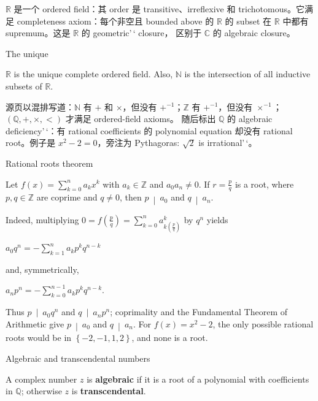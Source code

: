 \(\mathbb{R}\) 是一个 ordered field：其 order 是 transitive、irreflexive 和 trichotomous。它满足 completeness axiom：每个非空且 bounded above 的 \(\mathbb{R}\) 的 subset 在 \(\mathbb{R}\) 中都有 supremum。这是 \(\mathbb{R}\) 的 geometric'\,` closure， 区别于 \(\mathbb{C}\) 的 algebraic closure。

\begin{theorem}{The unique }

\(\mathbb{R}\) is the unique complete ordered field. Also, \(\mathbb{N}\) is the intersection of all inductive subsets of \(\mathbb{R}\).

\end{theorem}

源页以混排写道：\(\mathbb{N}\) 有 \(+\) 和 \(\times\)，但没有 \(+^{- 1}\)；\(\mathbb{Z}\) 有 \(+^{- 1}\)，但没有 \(\times^{- 1}\)；\(\left( {\mathbb{Q}, + , \times , <} \right)\) 才满足 ordered-field axioms。 随后标出 \(\mathbb{Q}\) 的 algebraic deficiency'\,`：有 rational coefficients 的 polynomial equation 却没有 rational root。例子是 \(x^{2} - 2 = 0\)，旁注为 Pythagoras: \(\sqrt{2}\) is irrational'\,`。

\begin{theorem}{Rational roots theorem}

Let \(f(x) = \sum_{k = 0}^{n}a_{k}x^{k}\) with \(a_{k} \in \mathbb{Z}\) and \(a_{0}a_{n} \neq 0\). If \(r = \frac{p}{q}\) is a root, where \(p,q \in \mathbb{Z}\) are coprime and \(q \neq 0\), then \(\left. p\  \middle| \ a_{0} \right.\) and \(\left. q\  \middle| \ a_{n} \right.\).

\end{theorem}

Indeed, multiplying \(0 = f\left( \frac{p}{q} \right) = \sum_{k = 0}^{n}a_{k{(\frac{p}{q})}}^{k}\) by \(q^{n}\) yields

\(a_{0}q^{n} = - \sum_{k = 1}^{n}a_{k}p^{k}q^{n - k}\)

and, symmetrically,

\(a_{n}p^{n} = - \sum_{k = 0}^{n - 1}a_{k}p^{k}q^{n - k}\).

Thus \(\left. p\  \middle| \ a_{0}q^{n} \right.\) and \(\left. q\  \middle| \ a_{n}p^{n} \right.\); coprimality and the Fundamental Theorem of Arithmetic give \(\left. p\  \middle| \ a_{0} \right.\) and \(\left. q\  \middle| \ a_{n} \right.\). For \(f(x) = x^{2} - 2\), the only possible rational roots would be in \(\left\{ {- 2, - 1,1,2} \right\}\), and none is a root.

\begin{definition}{Algebraic and transcendental numbers}

A complex number \(z\) is \textbf{algebraic} if it is a root of a polynomial with coefficients in \(\mathbb{Q}\); otherwise \(z\) is \textbf{transcendental}.

\end{definition}

